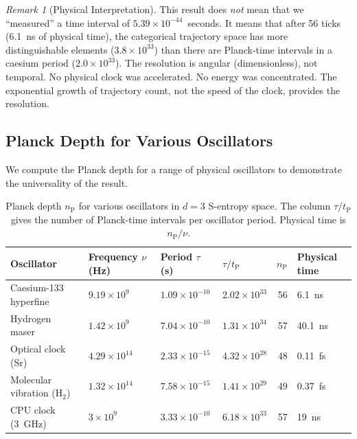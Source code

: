 \documentclass[twocolumn,10pt,a4paper]{article}
\theoremstyle{definition}
\theoremstyle{remark}
\newtheorem{remark}[theorem]{Remark}
\newcommand{\tP}{t_{\mathrm{P}}}
\newcommand{\nP}{n_{\mathrm{P}}}
\begin{document}
\begin{remark}[Physical Interpretation]
\label{rem:interpretation}
This result does \emph{not} mean that we ``measured'' a time interval of $5.39 \times 10^{-44}$~seconds. It means that after 56 ticks (6.1~ns of physical time), the categorical trajectory space has more distinguishable elements ($3.8 \times 10^{33}$) than there are Planck-time intervals in a caesium period ($2.0 \times 10^{33}$). The resolution is angular (dimensionless), not temporal. No physical clock was accelerated. No energy was concentrated. The exponential growth of trajectory count, not the speed of the clock, provides the resolution.
\end{remark}

\subsection{Planck Depth for Various Oscillators}

We compute the Planck depth for a range of physical oscillators to demonstrate the universality of the result.

\begin{table}[t]
\centering
\caption{Planck depth $\nP$ for various oscillators in $d = 3$ S-entropy space. The column $\tau/\tP$ gives the number of Planck-time intervals per oscillator period. Physical time is $\nP / \nu$.}
\label{tab:oscillators}
\begin{tabular}{@{}llllrl@{}}
\toprule
Oscillator & Frequency $\nu$ (Hz) & Period $\tau$ (s) & $\tau / \tP$ & $\nP$ & Physical time \\
\midrule
Caesium-133 hyperfine       & $9.19 \times 10^{9}$  & $1.09 \times 10^{-10}$ & $2.02 \times 10^{33}$ & 56  & 6.1~ns \\
Hydrogen maser              & $1.42 \times 10^{9}$  & $7.04 \times 10^{-10}$ & $1.31 \times 10^{34}$ & 57  & 40.1~ns \\
Optical clock (Sr)          & $4.29 \times 10^{14}$ & $2.33 \times 10^{-15}$ & $4.32 \times 10^{28}$ & 48  & 0.11~fs \\
Molecular vibration (H$_2$) & $1.32 \times 10^{14}$ & $7.58 \times 10^{-15}$ & $1.41 \times 10^{29}$ & 49  & 0.37~fs \\
CPU clock (3~GHz)           & $3 \times 10^{9}$     & $3.33 \times 10^{-10}$ & $6.18 \times 10^{33}$ & 57  & 19~ns \\
\bottomrule
\end{tabular}
\end{table}
\end{document}
